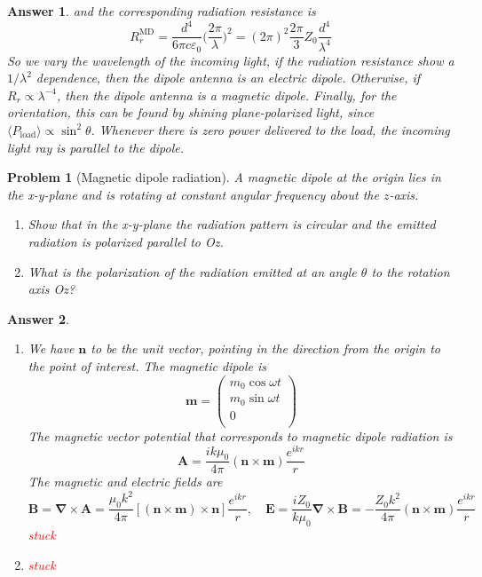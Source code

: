 \documentclass[a4paper]{article}
\newtheorem{ans}{Answer}
\theoremstyle{new}
\newtheorem{qns}{Problem}
\begin{document}
\begin{ans}
and the corresponding radiation resistance is
$$R_r^{\text{MD}}=\frac{d^4}{6\pi c\varepsilon_0}\bigg(\frac{2\pi}{\lambda}\bigg)^2=(2\pi)^2\frac{2\pi}{3}Z_0\frac{d^4}{\lambda^4}$$
So we vary the wavelength of the incoming light, if the radiation resistance show a $1/\lambda^2$ dependence, then the dipole antenna is an electric dipole. Otherwise, if $R_r\propto\lambda^{-4}$, then the dipole antenna is a magnetic dipole. Finally, for the orientation, this can be found by shining plane-polarized light, since $\langle P_{\text{load}}\rangle\propto\sin^2\theta$. Whenever there is zero power delivered to the load, the incoming light ray is parallel to the dipole.
\end{ans}
\newpage
\begin{qns}[Magnetic dipole radiation]
A magnetic dipole at the origin lies in the x-y-plane and is rotating at constant angular frequency about the $z$-axis.
\begin{enumerate}[label=(\alph*)]
\item Show that in the x-y-plane the radiation pattern is circular and the emitted radiation is polarized parallel to Oz.
\item What is the polarization of the radiation emitted at an angle $\theta$ to the rotation axis Oz?
\end{enumerate}
\end{qns}
\begin{ans}\leavevmode
\begin{enumerate}[label=(\alph*)]
\item We have $\mathbf{n}$ to be the unit vector, pointing in the direction from the origin to the point of interest. The magnetic dipole is
$$\mathbf{m}=\begin{pmatrix}m_0\cos\omega t\\m_0\sin\omega t\\0\\\end{pmatrix}$$
The magnetic vector potential that corresponds to magnetic dipole radiation is
$$\mathbf{A}=\frac{ik\mu_0}{4\pi}(\mathbf{n}\times\mathbf{m})\frac{e^{ikr}}{r}$$
The magnetic and electric fields are
$$\mathbf{B}=\boldsymbol{\nabla}\times\mathbf{A}=\frac{\mu_0k^2}{4\pi}[(\mathbf{n}\times\mathbf{m})\times\mathbf{n}]\frac{e^{ikr}}{r},\quad\mathbf{E}=\frac{iZ_0}{k\mu_0}\boldsymbol{\nabla}\times\mathbf{B}=-\frac{Z_0k^2}{4\pi}(\mathbf{n}\times\mathbf{m})\frac{e^{ikr}}{r}$$
\textcolor{red}{stuck}
\item \textcolor{red}{stuck}

\end{enumerate}
\end{ans}
\end{document}
